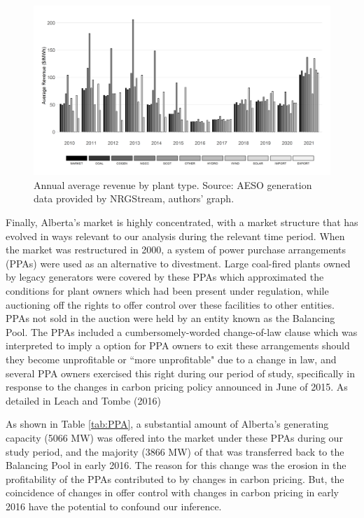 \documentclass[12pt]{article}
\begin{document}
\begin{figure}[t]%
	\centering \vspace{-.25cm} \includegraphics[width=6.5in]{../images/price_capture.png}
\vspace{-0.75cm}	\caption{Annual average revenue by plant type. Source: AESO generation data provided by NRGStream, authors' graph.}
\label{fig:capture_prices}
\end{figure}

Finally, Alberta's market is highly concentrated, with a market structure that has evolved in ways relevant to our analysis during the relevant time period. When the market was restructured in 2000, a system of power purchase arrangements (PPAs) were used as an alternative to divestment. Large coal-fired plants owned by legacy generators were covered by these PPAs which approximated the conditions for plant owners which had been present under regulation, while auctioning off the rights to offer control over these facilities to other entities. PPAs not sold in the auction were held by an entity known as the Balancing Pool. The PPAs included a cumbersomely-worded change-of-law clause which was interpreted to imply a option for PPA owners to exit these arrangements should they become unprofitable or ``more unprofitable" due to a change in law, and several PPA owners exercised this right during our period of study, specifically in response to the changes in carbon pricing policy announced in June of 2015. As detailed in Leach and Tombe (2016)

As shown in Table \ref{tab:PPA}, a substantial amount of Alberta's generating capacity (5066 MW) was offered into the market under these PPAs during our study period, and the majority (3866 MW) of that was transferred back to the Balancing Pool in early 2016. The reason for this change was the erosion in the profitability of the PPAs contributed to by changes in carbon pricing. But, the coincidence of changes in offer control with changes in carbon pricing in early 2016 have the potential to confound our inference.
\end{document}
